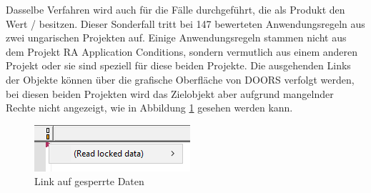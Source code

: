 Dasselbe Verfahren wird auch für die Fälle durchgeführt, die als Produkt den Wert \glqq /\grqq{} besitzen. Dieser Sonderfall tritt bei 147 bewerteten Anwendungsregeln
aus zwei ungarischen Projekten auf.
Einige Anwendungsregeln stammen nicht aus dem Projekt RA Application Conditions, sondern vermutlich aus einem anderen Projekt oder sie sind speziell 
für diese beiden Projekte. Die ausgehenden Links der Objekte können über die grafische Oberfläche von \ac{DOORS} verfolgt werden, bei diesen beiden Projekten
wird das Zielobjekt aber aufgrund mangelnder Rechte nicht angezeigt, wie in Abbildung \ref{fig:LockedData} gesehen werden kann. 

\begin{figure}[H]
    \centering
    \includegraphics[width = \textwidth/2]{abbildungen/LockedData.PNG}
    \caption{Link auf gesperrte Daten}
    \label{fig:LockedData}
\end{figure}
